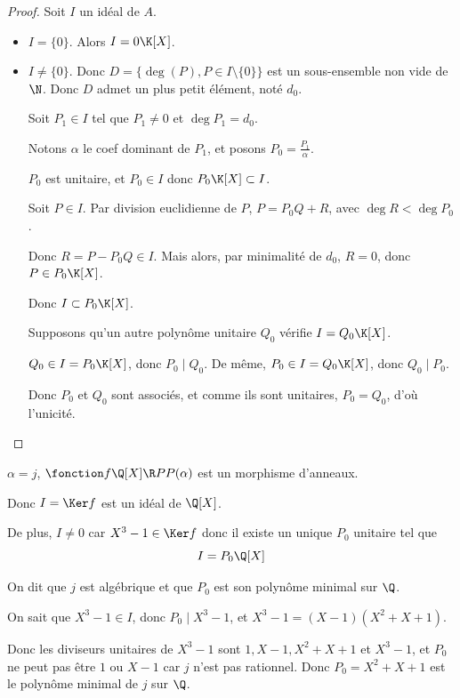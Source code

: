\begin{proof}
    Soit $I$ un idéal de $A$. 

    \begin{itemize}
        \item $I = \{0\}$. Alors $I = 0 \K[X]$.

        \item  $I \neq \{0\}$. Donc $D = \{\deg(P), P \in I \setminus \{0\}\}$ 
        est un sous-ensemble non vide de $\N$. Donc $D$ admet un plus petit élément, noté $d_0$.

        Soit $P_1 \in I$ tel que $P_1 \neq 0 $ et $\deg P_1 = d_0$.

        Notons $\alpha$ le coef dominant de $P_1$, et posons $P_0 = \frac{P_1} \alpha$. 

        $P_0$ est unitaire, et $P_0 \in I$ donc $P_0 \K[X] \subset I$.

        \avspace Soit $P \in I$. Par division euclidienne de $P$, $P = P_0 Q + R$, avec 
        $\deg R < \deg P_0$.

        Donc $R = P - P_0 Q \in I$. Mais alors, par minimalité de $d_0$,
        $R = 0$, donc $P \in P_0 \K[X]$.

        Donc $I \subset P_0 \K[X]$.

        \lvspace Supposons qu'un autre polynôme unitaire $Q_0$ vérifie $I = Q_0 \K[X]$.

        $Q_0 \in I = P_0 \K[X]$, donc $P_0 \mid Q_0$. De même, $P_0 \in I = Q_0 \K[X]$, donc $Q_0 \mid P_0$.

        Donc $P_0$ et $Q_0$ sont associés, et comme ils sont unitaires, $P_0 = Q_0$, d'où l'unicité.
    \end{itemize}
\end{proof}

\begin{exemple}
    $\alpha = j$, $\fonction f {\Q[X]}\R P {P(\alpha)}$ est un morphisme d'anneaux.

    Donc $I = \Ker f$ est un idéal de $\Q[X]$.

    De plus, $I \neq 0$ car $X^3 - 1 \in \Ker f$ donc il existe un unique $P_0$ unitaire
    tel que \[I = P_0 \Q[X]\]

    On dit que $j$ est algébrique et que $P_0$ est son polynôme minimal sur $\Q$.

    On sait que $X^3 - 1 \in I$, donc $P_0 \mid X^3 - 1$, et 
    $X^3 - 1 = (X - 1)(X^2 + X + 1)$. 

    Donc les diviseurs unitaires de $X^3 - 1$ sont $1, X - 1, X^2 + X + 1$ et $X^3 - 1$, et 
    $P_0$ ne peut pas être $1$ ou $X - 1$ car $j$ n'est pas rationnel. 
    Donc $P_0 = X^2 + X + 1$ est le polynôme minimal de $j$ sur $\Q$.
\end{exemple}

